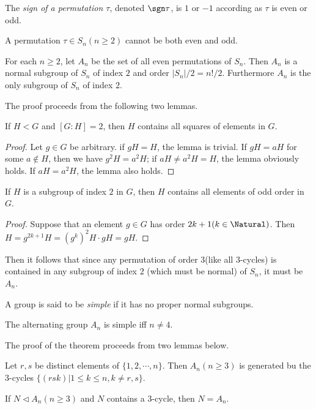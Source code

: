 The \textit{sign of a permutation $ \tau $}, denoted $ \sgn \tau $, is $ 1 $ or $ -1 $ according as $ \tau $ is even or odd.
\begin{theorem}
	A permutation $ \tau \in S_n (n \geqslant 2)$ cannot be both even and odd.
\end{theorem}
\begin{theorem}
	For each $ n \geqslant 2 $, let $ A_n $ be the set of all even permutations of $ S_n $. Then $ A_n $ is a normal subgroup of $ S_n $ of index $ 2 $ and order $ |S_n|/2=n!/2 $. Furthermore $ A_n $ is the only subgroup of $ S_n $ of index $ 2 $.
\end{theorem}
The proof proceeds from the following two lemmas.
\begin{lemma}
	If $ H < G$  and $ [G:H]=2 $, then $ H $ contains all squares of elements in $ G $.
\end{lemma}
\begin{proof}
	Let $ g \in G$ be arbitrary. if $ gH=H $, the lemma is trivial. If $ gH=aH $ for some $ a \notin H $, then we have $ g^2 H = a^2 H $; if $ aH \neq a^2 H=H $, the lemma obviously holds. If $ aH = a^2 H $, the lemma also holds.
\end{proof}
\begin{lemma}
	If $ H $ is a subgroup of index $ 2 $ in $ G $, then $ H $ contains all elements of odd order in $ G $.
\end{lemma}
\begin{proof}
	Suppose that an element $ g \in G $ has order $ 2k+1 (k \in \Natural)$. Then $ H = g^{2k+1}H=(g^{k})^2 H \cdot gH = gH $.
\end{proof}
Then it follows that since any permutation of order $ 3 $(like all $ 3 $-cycles) is contained in any subgroup of index $ 2 $ (which must be normal) of $ S_n $, it must be $ A_n $.
\begin{definition}
	A group is said to be \textit{simple} if it has no proper normal subgroups.
\end{definition}
\begin{theorem}
	The alternating group $ A_n $ is simple iff $ n \neq 4 $.
\end{theorem}
The proof of the theorem proceeds from two lemmas below.
\begin{lemma}
	Let $ r,s $ be distinct elements of $ \{1,2,\cdots,n\} $. Then $ A_n (n\geqslant 3)$ is generated bu the $ 3 $-cycles $ \{(rsk)|1\leqslant k \leqslant n,k \neq r,s\} $.
\end{lemma}
\begin{lemma}
	If $ N \triangleleft A_n(n\geqslant 3)$  and $ N $ contains a $ 3 $-cycle, then $ N=A_n $.
\end{lemma}
